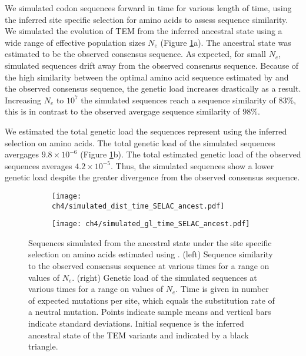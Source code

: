 We simulated codon sequences forward in time for various length of time, using the \selac inferred site specific selection for amino acids to assess sequence similarity.
We simulated the evolution of TEM from the inferred ancestral state using a wide range of effective population sizes $N_e$ (Figure \ref{fig:selac_sim}a).
The ancestral state was estimated to be the observed consensus sequence.
As expected, for small $N_e$, simulated sequences drift away from the observed consensus sequence. 
Because of the high similarity between the optimal amino acid sequence estimated by \selac and the observed consensus sequence, the genetic load increases drastically as a result.
Increasing $N_e$ to $10^7$ the simulated sequences reach a sequence similarity of $83 \%$, this is in contrast to the observed avergage sequence similarity of $98 \%$.

We estimated the total genetic load the sequences represent using the \selac inferred selection on amino acids.
The total genetic load of the simulated sequences avergages $9.8\times10^{-6}$ (Figure \ref{fig:selac_sim}b).
The total estimated genetic load of the observed sequences averages $4.2\times 10^{-5}$.
Thus, the simulated sequences show a lower genetic load despite the greater divergence from the observed consensus sequence.

\begin{figure}[h]
    \centering
    \begin{subfigure}
        \centering
        \texttt{[image: ch4/simulated\_dist\_time\_SELAC\_ancest.pdf]}
    \end{subfigure}
    \begin{subfigure}
        \centering
        \texttt{[image: ch4/simulated\_gl\_time\_SELAC\_ancest.pdf]}
    \end{subfigure}
    \caption{Sequences simulated from the ancestral state under the site specific selection on amino acids estimated using \selac. 
    (left) Sequence similarity to the observed consensus sequence at various times for a range on values of $N_e$.
    (right) Genetic load of the simulated sequences at various times for a range on values of $N_e$.
    Time is given in number of expected mutations per site, which equals the substitution rate of a neutral mutation.
    Points indicate sample means and vertical bars indicate standard deviations. Initial sequence is the inferred ancestral state of the TEM variants and indicated by a black triangle.}
    \label{fig:selac_sim}
\end{figure}

